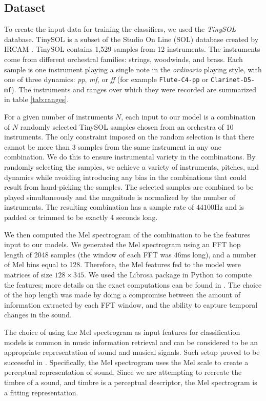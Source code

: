 \documentclass[runningheads,a4paper]{llncs}
\begin{document}
\subsection{Dataset}
\label{sec:dataset}

To create the input data for training the classifiers, we used the \emph{TinySOL} database. TinySOL is a subset of the Studio On Line (SOL) database created by IRCAM \cite{Cella2020b}. TinySOL contains 1,529 samples from 12 instruments. The instruments come from different orchestral families: strings, woodwinds, and brass. Each sample is one instrument playing a single note in the \emph{ordinario} playing style, with one of three dynamics: \textit{pp}, \textit{mf}, or \textit{ff} (for example \texttt{Flute-C4-pp} or \texttt{Clarinet-D5-mf}). The instruments and ranges over which they were recorded are summarized in table \ref{tab:ranges}.

For a given number of instruments $N$, each input to our model is a combination of $N$ randomly selected TinySOL samples chosen from an orchestra of 10 instruments. The only constraint imposed on the random selection is that there cannot be more than 3 samples from the same instrument in any one combination. We do this to ensure instrumental variety in the combinations. By randomly selecting the samples, we achieve a variety of instruments, pitches, and dynamics while avoiding introducing any bias in the combinations that could result from hand-picking the samples. The selected samples are combined to be played simultaneously and the magnitude is normalized by the number of instruments. The resulting combination has a sample rate of $44100$Hz and is padded or trimmed to be exactly 4 seconds long.

We then computed the Mel spectrogram of the combination to be the features input to our models. We generated the Mel spectrogram using an FFT hop length of 2048 samples (the window of each FFT was $46$ms long), and a number of Mel bins equal to 128. Therefore, the Mel features fed to the model were matrices of size $128\times 345$. We used the Librosa package in Python to compute the features; more details on the exact computations can be found in \cite{mcfee15}. The choice of the hop length was made by doing a compromise between the amount of information extracted by each FFT window, and the ability to capture temporal changes in the sound.

The choice of using the Mel spectrogram as input features for classification models is common in music information retrieval \cite{McKinney2003} and can be considered to be an appropriate representation of sound and musical signals. Such setup proved to be successful in \cite{Salamon17}. Specifically, the Mel spectrogram uses the Mel scale to create a perceptual representation of sound. Since we are attempting to recreate the timbre of a sound, and timbre is a perceptual descriptor, the Mel spectrogram is a fitting representation.
 
\end{document}
